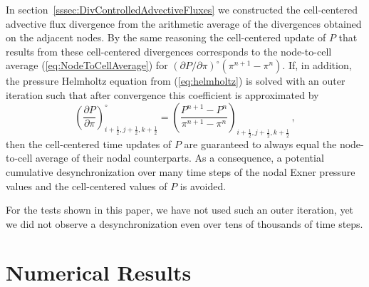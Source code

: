 \documentclass[12pt,a4paper]{article}
\theoremstyle{definition}
\newcommand{\eq}[1]{(\ref{#1})}
\newcommand{\halff}{\frac{1}{2}}
\begin{document}
In section~\ref{sssec:DivControlledAdvectiveFluxes} we constructed the cell-centered advective flux divergence from the arithmetic
average of the divergences obtained on the adjacent nodes. By the same 
reasoning the cell-centered update of $P$ that results
from these cell-centered divergences corresponds to the node-to-cell average 
\eq{eq:NodeToCellAverage} for 
$(\partial P/\partial \pi)^{\circ} (\pi^{n+1}-\pi^{n})$.
If, in addition, the pressure Helmholtz equation from \eq{eq:helmholtz} is
solved with an outer iteration such that after convergence this coefficient
is approximated by  
%
\begin{equation}
\left(\frac{\partial P}{\partial \pi}\right)^{\circ}_{i+\halff,j+\halff,k+\halff}
= \left(\frac{P^{n+1} - P^{n}}{\pi^{n+1} - \pi^{n}}\right)_{i+\halff,j+\halff,k+\halff}\,,
\end{equation}
%
then the cell-centered time updates of $P$ are guaranteed to always equal the
node-to-cell average of their nodal counterparts. As a consequence, a potential
cumulative desynchronization over many time steps of the nodal Exner pressure 
values and the cell-centered values of $P$ is avoided. 

For the tests shown in this paper, we have not used such an outer iteration, yet we did not observe a desynchronization even over tens of thousands of time steps. 



\section{Numerical Results}
\label{sec:Results}
\end{document}
